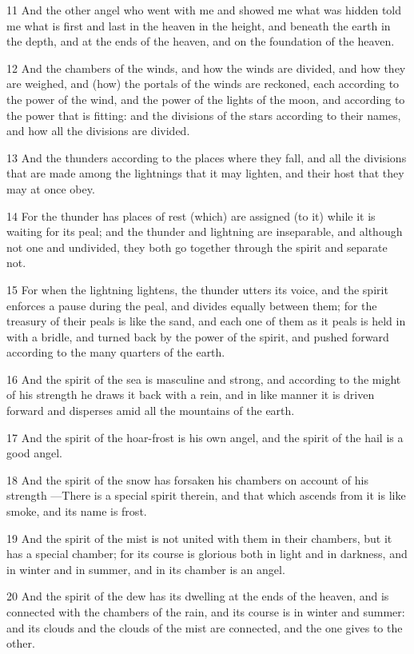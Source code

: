 \par 11 And the other angel who went with me and showed me what was hidden told me what is first and last in the heaven in the height, and beneath the earth in the depth, and at the ends of the heaven, and on the foundation of the heaven.
\par 12 And the chambers of the winds, and how the winds are divided, and how they are weighed, and (how) the portals of the winds are reckoned, each according to the power of the wind, and the power of the lights of the moon, and according to the power that is fitting: and the divisions of the stars according to their names, and how all the divisions are divided.
\par 13 And the thunders according to the places where they fall, and all the divisions that are made among the lightnings that it may lighten, and their host that they may at once obey.
\par 14 For the thunder has places of rest (which) are assigned (to it) while it is waiting for its peal; and the thunder and lightning are inseparable, and although not one and undivided, they both go together through the spirit and separate not.
\par 15 For when the lightning lightens, the thunder utters its voice, and the spirit enforces a pause during the peal, and divides equally between them; for the treasury of their peals is like the sand, and each one of them as it peals is held in with a bridle, and turned back by the power of the spirit, and pushed forward according to the many quarters of the earth.
\par 16 And the spirit of the sea is masculine and strong, and according to the might of his strength he draws it back with a rein, and in like manner it is driven forward and disperses amid all the mountains of the earth.
\par 17 And the spirit of the hoar-frost is his own angel, and the spirit of the hail is a good angel.
\par 18 And the spirit of the snow has forsaken his chambers on account of his strength —There is a special spirit therein, and that which ascends from it is like smoke, and its name is frost.
\par 19 And the spirit of the mist is not united with them in their chambers, but it has a special chamber; for its course is glorious both in light and in darkness, and in winter and in summer, and in its chamber is an angel.
\par 20 And the spirit of the dew has its dwelling at the ends of the heaven, and is connected with the chambers of the rain, and its course is in winter and summer: and its clouds and the clouds of the mist are connected, and the one gives to the other.
